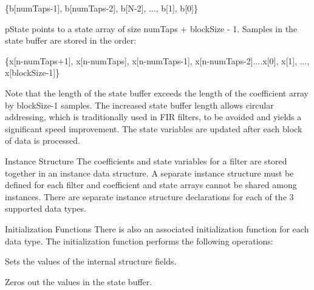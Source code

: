 \begin{DoxyParagraph}{}

\begin{DoxyPre}   
    \{b[numTaps-1], b[numTaps-2], b[N-2], ..., b[1], b[0]\}   
 \end{DoxyPre}
 
\end{DoxyParagraph}
\begin{DoxyParagraph}{}
{\ttfamily p\-State} points to a state array of size {\ttfamily num\-Taps + block\-Size -\/ 1}. Samples in the state buffer are stored in the order\-: 
\end{DoxyParagraph}
\begin{DoxyParagraph}{}

\begin{DoxyPre}   
    \{x[n-numTaps+1], x[n-numTaps], x[n-numTaps-1], x[n-numTaps-2]....x[0], x[1], ..., x[blockSize-1]\}   
 \end{DoxyPre}
 
\end{DoxyParagraph}
\begin{DoxyParagraph}{}
Note that the length of the state buffer exceeds the length of the coefficient array by {\ttfamily block\-Size-\/1} samples. The increased state buffer length allows circular addressing, which is traditionally used in F\-I\-R filters, to be avoided and yields a significant speed improvement. The state variables are updated after each block of data is processed. 
\end{DoxyParagraph}
\begin{DoxyParagraph}{Instance Structure }
The coefficients and state variables for a filter are stored together in an instance data structure. A separate instance structure must be defined for each filter and coefficient and state arrays cannot be shared among instances. There are separate instance structure declarations for each of the 3 supported data types.
\end{DoxyParagraph}
\begin{DoxyParagraph}{Initialization Functions }
There is also an associated initialization function for each data type. The initialization function performs the following operations\-:
\begin{DoxyItemize}
\item Sets the values of the internal structure fields.
\item Zeros out the values in the state buffer. 
\end{DoxyItemize}
\end{DoxyParagraph}
